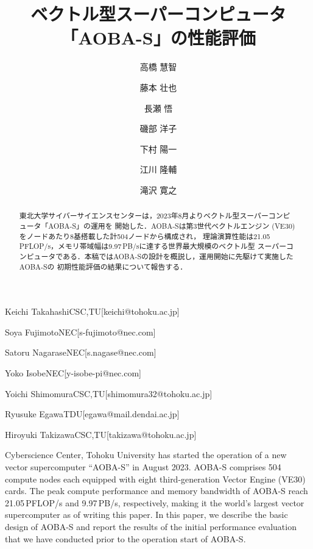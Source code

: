 ﻿\documentclass[submit,techrep,noauthor]{ipsj}
\begin{document}
\title{ベクトル型スーパーコンピュータ「AOBA-S」の性能評価}



\author{高橋 慧智}{Keichi Takahashi}{CSC,TU}[keichi@tohoku.ac.jp]
\author{藤本 壮也}{Soya Fujimoto}{NEC}[s-fujimoto@nec.com]
\author{長瀬 悟}{Satoru Nagarase}{NEC}[s.nagase@nec.com]
\author{磯部 洋子}{Yoko Isobe}{NEC}[y-isobe-pi@nec.com]
\author{下村 陽一}{Yoichi Shimomura}{CSC,TU}[shimomura32@tohoku.ac.jp]
\author{江川 隆輔}{Ryusuke Egawa}{TDU}[egawa@mail.dendai.ac.jp]
\author{滝沢 寛之}{Hiroyuki Takizawa}{CSC,TU}[takizawa@tohoku.ac.jp]

\begin{abstract}
東北大学サイバーサイエンスセンターは，2023年8月よりベクトル型スーパーコンピュータ「AOBA-S」の運用を
開始した．AOBA-Sは第3世代ベクトルエンジン (VE30) をノードあたり8基搭載した計504ノードから構成され，
理論演算性能は21.05\,PFLOP/s，メモリ帯域幅は9.97\,PB/sに達する世界最大規模のベクトル型
スーパーコンピュータである．本稿ではAOBA-Sの設計を概説し，運用開始に先駆けて実施したAOBA-Sの
初期性能評価の結果について報告する．
\end{abstract}

\begin{eabstract}
Cyberscience Center, Tohoku University has started the operation of a new vector supercomputer 
``AOBA-S'' in August 2023. AOBA-S comprises 504 compute nodes each equipped with eight
third-generation Vector Engine (VE30) cards. The peak compute performance and memory bandwidth of
AOBA-S reach 21.05\,PFLOP/s and 9.97\,PB/s, respectively, making it the world's largest vector
supercomputer as of writing this paper. In this paper, we describe the basic design of AOBA-S and
report the results of the initial performance evaluation that we have conducted prior to the
operation start of AOBA-S.
\end{eabstract}

%
%
\end{document}
